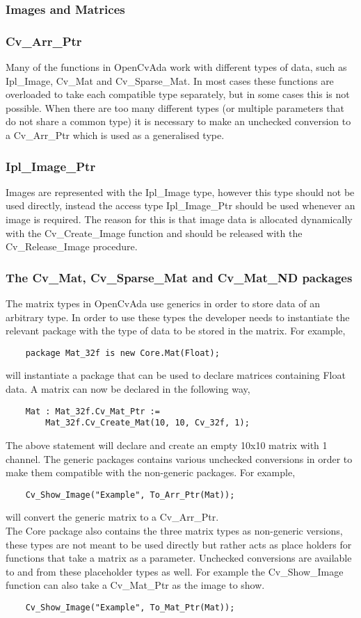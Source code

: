 \subsubsection{Images and Matrices}
\subsubsection*{Cv_Arr_Ptr}
Many of the functions in OpenCvAda work with different types of data, such as Ipl_Image, Cv_Mat and Cv_Sparse_Mat. In most cases these functions are overloaded to take each compatible type separately, but in some cases this is not possible.
When there are too many different types (or multiple parameters that do not share a common type) it is necessary to make an unchecked conversion to a Cv_Arr_Ptr which is used as a generalised type.
\subsubsection*{Ipl_Image_Ptr}
Images are represented with the Ipl_Image type, however this type should not be used directly, instead the access type Ipl_Image_Ptr should be used whenever an image is required. The reason for this is that image data is allocated dynamically with the Cv_Create_Image function and should be released with the Cv_Release_Image procedure. 
\subsubsection*{The Cv_Mat, Cv_Sparse_Mat and Cv_Mat_ND packages}
The matrix types in OpenCvAda use generics in order to store data of an arbitrary type. In order to use these types the developer needs to instantiate the relevant package with the type of data to be stored in the matrix. For example,
\begin{lstlisting}
	package Mat_32f is new Core.Mat(Float);
\end{lstlisting}
will instantiate a package that can be used to declare matrices containing Float data. A matrix can now be declared in the following way,
\begin{lstlisting}
	Mat : Mat_32f.Cv_Mat_Ptr := 
		Mat_32f.Cv_Create_Mat(10, 10, Cv_32f, 1);
\end{lstlisting}
The above statement will declare and create an empty 10x10 matrix with 1 channel.
The generic packages contains various unchecked conversions in order to make them compatible with the non-generic packages. For example,
\begin{lstlisting}
	Cv_Show_Image("Example", To_Arr_Ptr(Mat));
\end{lstlisting}
will convert the generic matrix to a Cv_Arr_Ptr.
\\
The Core package also contains the three matrix types as non-generic versions, these types are not meant to be used directly but rather acts as place holders for functions that take a matrix as a parameter. Unchecked conversions are available to and from these placeholder types as well. For example the Cv_Show_Image function can also take a Cv_Mat_Ptr as the image to show.
\begin{lstlisting}
	Cv_Show_Image("Example", To_Mat_Ptr(Mat));
\end{lstlisting}
